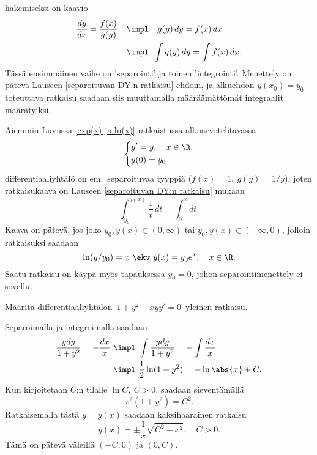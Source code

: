 hakemiseksi on kaavio
\begin{align*}
\frac{dy}{dx} = \frac{f(x)}{g(y)} \quad &\impl \quad g(y)\,dy = f(x)\,dx \\
                                        &\impl\,\ \int g(y)\,dy = \int f(x)\,dx.
\end{align*}
Tässä ensimmäinen vaihe on 'separointi' ja toinen 'integrointi'. Menettely on pätevä Lauseen
\ref{separoituvan DY:n ratkaisu} ehdoin, ja alkuehdon $y(x_0)=y_0$ toteuttava ratkaisu saadaan
siis muuttamalla määräämättömät integraalit määrätyiksi.
\begin{Exa} Aiemmin Luvussa \ref{exp(x) ja ln(x)} ratkaistussa alkuarvotehtävässä
\[
\left\{ \begin{aligned}
&y' = y,\quad x\in\R, \\
&y(0) = y_0
\end{aligned} \right.
\]
differentiaaliyhtälö on em.\ separoituvaa tyyppiä ($f(x)=1,\ g(y)=1/y$), joten ratkaisukaava on
Lauseen \ref{separoituvan DY:n ratkaisu} mukaan
\[
\int_{y_0}^{y(x)} \frac{1}{t}\,dt = \int_0^x dt.
\]
Kaava on pätevä, jos joko $y_0,y(x)\in(0,\infty)$ tai $y_0,y(x)\in(-\infty,0)$, jolloin
ratkaisuksi saadaan
\[
\ln (y/y_0)=x \ \ekv \ y(x)=y_0e^x, \quad x\in\R.
\]
Saatu ratkaisu on käypä myös tapauksessa $y_0=0$, johon  separointimenettely ei sovellu. \loppu
\end{Exa}
\begin{Exa}
Määritä differentiaaliyhtälön $\,1+y^2+xyy'=0\,$ yleinen ratkaisu.
\end{Exa}
\ratk Separoimalla ja integroimalla saadaan
\begin{align*}
\frac{ydy}{1+y^2} = -\frac{dx}{x} \ &\impl\ \int \frac{ydy}{1+y^2} = -\int \frac{dx}{x} \\
                                    &\impl\ \frac{1}{2}\ln (1+y^2) = - \ln\abs{x} +C.
\end{align*}
Kun kirjoitetaan $C$:n tilalle $\ln C,\ C>0$, saadaan sieventämällä
\[
x^2(1+y^2)=C^2.
\]
Ratkaisemalla tästä $y=y(x)$ saadaan kaksihaarainen ratkaisu
\[
y(x)=\pm\frac{1}{x}\sqrt{C^2-x^2},\quad C>0.
\]
Tämä on pätevä väleillä $(-C,0)$ ja $(0,C)$. \loppu

